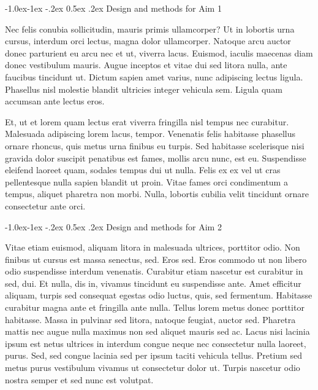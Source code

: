 \documentclass[11pt,]{article}
\makeatletter
\renewcommand\subsubsection{
  \@startsection{subsubsection}{3}{\z@}
    {-1.0ex\@plus -1ex \@minus -.2ex}%
    {0.5ex \@plus .2ex}%
    {\normalfont\normalsize\bf}} %
\makeatother
\begin{document}
\hypertarget{design-and-methods-for-aim-1}{%
\subsubsection{Design and methods for Aim
1}\label{design-and-methods-for-aim-1}}

Nec felis conubia sollicitudin, mauris primis ullamcorper? Ut in
lobortis urna cursus, interdum orci lectus, magna dolor ullamcorper.
Natoque arcu auctor donec parturient eu arcu nec et ut, viverra lacus.
Euismod, iaculis maecenas diam donec vestibulum mauris. Augue inceptos
et vitae dui sed litora nulla, ante faucibus tincidunt ut. Dictum sapien
amet varius, nunc adipiscing lectus ligula. Phasellus nisl molestie
blandit ultricies integer vehicula sem. Ligula quam accumsan ante lectus
eros.

Et, ut et lorem quam lectus erat viverra fringilla nisl tempus nec
curabitur. Malesuada adipiscing lorem lacus, tempor. Venenatis felis
habitasse phasellus ornare rhoncus, quis metus urna finibus eu turpis.
Sed habitasse scelerisque nisi gravida dolor suscipit penatibus est
fames, mollis arcu nunc, est eu. Suspendisse eleifend laoreet quam,
sodales tempus dui ut nulla. Felis ex ex vel ut cras pellentesque nulla
sapien blandit ut proin. Vitae fames orci condimentum a tempus, aliquet
pharetra non morbi. Nulla, lobortis cubilia velit tincidunt ornare
consectetur ante orci.

\hypertarget{design-and-methods-for-aim-2}{%
\subsubsection{Design and methods for Aim
2}\label{design-and-methods-for-aim-2}}

Vitae etiam euismod, aliquam litora in malesuada ultrices, porttitor
odio. Non finibus ut cursus est massa senectus, sed. Eros sed. Eros
commodo ut non libero odio suspendisse interdum venenatis. Curabitur
etiam nascetur est curabitur in sed, dui. Et nulla, dis in, vivamus
tincidunt eu suspendisse ante. Amet efficitur aliquam, turpis sed
consequat egestas odio luctus, quis, sed fermentum. Habitasse curabitur
magna ante et fringilla ante nulla. Tellus lorem metus donec porttitor
habitasse. Massa in pulvinar sed litora, natoque feugiat, auctor sed.
Pharetra mattis nec augue nulla maximus non sed aliquet mauris sed ac.
Lacus nisi lacinia ipsum est netus ultrices in interdum congue neque nec
consectetur nulla laoreet, purus. Sed, sed congue lacinia sed per ipsum
taciti vehicula tellus. Pretium sed metus purus vestibulum vivamus ut
consectetur dolor ut. Turpis nascetur odio nostra semper et sed nunc est
volutpat.
\end{document}
